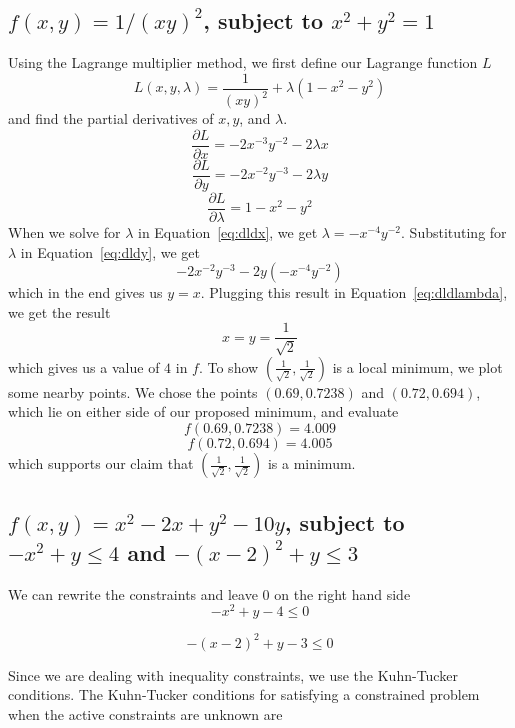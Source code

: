 \documentclass[11pt]{scrartcl}
\begin{document}
\subsection{$f(x,y) = 1/(xy)^2$, subject to $x^2 + y^2 = 1$}
Using the Lagrange multiplier method, we first define our Lagrange function $L$
\[L(x, y, \lambda) = \frac{1}{(xy)^2} +\lambda(1-x^2-y^2)\]
and find the partial derivatives of $x, y$, and $\lambda$.
\begin{equation}
	\label{eq:dldx}
	\frac{\partial L}{\partial x} = -2x^{-3}y^{-2} -2\lambda x
\end{equation}
\begin{equation}
	\label{eq:dldy}
	\frac{\partial L}{\partial y} = -2x^{-2}y^{-3}-2\lambda y
\end{equation}
\begin{equation}
	\label{eq:dldlambda}
	\frac{\partial L }{\partial \lambda} = 1-x^2-y^2
\end{equation}
When we solve for $\lambda$ in Equation~\ref{eq:dldx}, we get 
$\lambda = -x^{-4}y^{-2}$.
Substituting for $\lambda$ in Equation~\ref{eq:dldy}, we get
\[-2x^{-2}y^{-3}-2y(-x^{-4}y^{-2})\]
which in the end gives us $y=x$.
Plugging this result in Equation~\ref{eq:dldlambda}, we get the result
\[x = y = \frac{1}{\sqrt{2}}\]
which gives us a value of $4$ in $f$.
To show $(\frac{1}{\sqrt{2}},\frac{1}{\sqrt{2}})$ is a local minimum, we 
plot some nearby points.
We chose the points $(0.69, 0.7238)$ and $(0.72, 0.694)$, which lie on either
side of our proposed minimum, and evaluate
\[f(0.69, 0.7238) = 4.009\]
\[f(0.72, 0.694) = 4.005\]
which supports our claim that $(\frac{1}{\sqrt{2}},\frac{1}{\sqrt{2}})$ is a minimum.

\subsection{$f(x,y) = x^2 - 2x + y^2- 10y$, 
subject to $-x^2 + y \leq 4$ and $-(x-2)^2 + y \leq 3$}
We can rewrite the constraints and leave $0$ on the right hand
side
\begin{equation}
	\label{eq:g1}
	-x^2 + y - 4\leq 0
\end{equation}

\begin{equation}
	\label{eq:g2}
-(x-2)^2 + y - 3 \leq 0
\end{equation}

Since we are dealing with inequality constraints, we use the Kuhn-Tucker conditions.
The Kuhn-Tucker conditions for satisfying a constrained problem when the 
active constraints are unknown are
\end{document}
